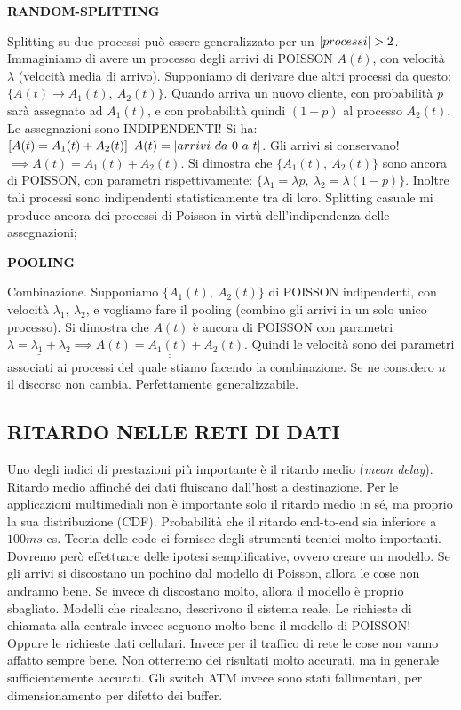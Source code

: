 \begin{thrm}{\textbf{RANDOM-SPLITTING}}

Splitting su due processi può essere generalizzato per un $\left\vert{processi}\right\vert > 2$. Immaginiamo di avere un processo degli arrivi di POISSON $A(t)$, con velocità $\lambda$ (velocità media di arrivo). Supponiamo di derivare due altri processi da questo: $\{A(t) \rightarrow A_1(t),\ A_2(t)\}$. Quando arriva un nuovo cliente, con probabilità $p$ sarà assegnato ad $A_1(t)$, e con probabilità quindi $(1-p)$ al processo $A_2(t)$. Le assegnazioni sono INDIPENDENTI! Si ha: $[A(t) = A_1(t) + A_2(t)]\,\ A(t) = \left\vert{arrivi\ da\ 0\ a\ t}\right\vert$. Gli arrivi si conservano! $\implies A(t) = A_1(t) + A_2(t)$. Si dimostra che $\{A_1(t),\ A_2(t)\}$ sono ancora di POISSON, con parametri rispettivamente: $\{\lambda_1=\lambda p,\ \lambda_2 = \lambda (1-p)\}$. Inoltre tali processi sono indipendenti statisticamente tra di loro. Splitting casuale mi produce ancora dei processi di Poisson in virtù dell'indipendenza delle assegnazioni;
\end{thrm}

\begin{thrm}{\textbf{POOLING}}

Combinazione. Supponiamo $\{A_1(t),\ A_2(t)\}$ di POISSON indipendenti, con velocità $\lambda_1,\ \lambda_2$, e vogliamo fare il pooling (combino gli arrivi in un solo unico processo). Si dimostra che $A(t)$ è ancora di POISSON con parametri $\underline{\lambda = \lambda_1+\lambda_2} \implies \underline{\underline{A(t) = A_1(t)+A_2(t)}}$. Quindi le velocità sono dei parametri associati ai processi del quale stiamo facendo la combinazione. Se ne considero $n$ il discorso non cambia. Perfettamente generalizzabile.
\end{thrm}

\subsection{RITARDO NELLE RETI DI DATI}

Uno degli indici di prestazioni più importante è il ritardo medio (\textit{mean delay}). Ritardo medio affinché dei dati fluiscano dall'host a destinazione. Per le applicazioni multimediali non è importante solo il ritardo medio in sé, ma proprio la sua distribuzione (CDF). Probabilità che il ritardo end-to-end sia inferiore a $100ms$ es. Teoria delle code ci fornisce degli strumenti tecnici molto importanti. Dovremo però effettuare delle ipotesi semplificative, ovvero creare un modello. Se gli arrivi si discostano un pochino dal modello di Poisson, allora le cose non andranno bene. Se invece di discostano molto, allora il modello è proprio sbagliato. Modelli che ricalcano, descrivono il sistema reale. Le richieste di chiamata alla centrale invece seguono molto bene il modello di POISSON! Oppure le richieste dati cellulari. Invece per il traffico di rete le cose non vanno affatto sempre bene. Non otterremo dei risultati molto accurati, ma in generale sufficientemente accurati. Gli switch ATM invece sono stati fallimentari, per dimensionamento per difetto dei buffer.

